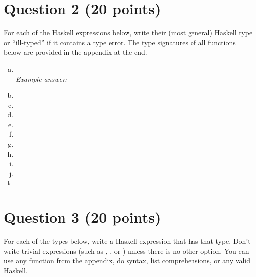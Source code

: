 \documentclass{article}
\begin{document}
\pagebreak
\section*{Question 2 (20 points)}

For each of the Haskell expressions below, write their (most general)
Haskell type or ``ill-typed'' if it contains a type error. The type
signatures of all functions below are provided in the appendix at the
end.

\begin{enumerate}[(a)]
\itemsep2em
\item {} \\
  {\em Example answer:}\\
  \vspace*{-1.5em}
\item {}
\item {}
\item {}  
\item {}
\item {}
\item {}
\item {}
\item {}
\item {}  
\item {}
\end{enumerate}

\pagebreak
\section*{Question 3 (20 points)}

For each of the types below, write a Haskell expression that has that
type.  Don't write trivial expressions (such as \haske{[]},
, or ) unless there is no other
option. You can use any function from the appendix, do syntax, list
comprehensions, or any valid Haskell.
\end{document}
